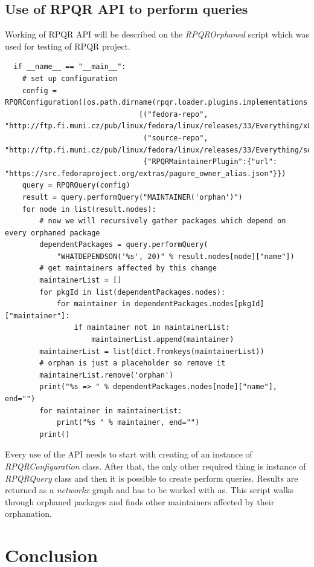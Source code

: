 \section{Use of RPQR API to perform queries}

Working of RPQR API will be described on the \textit{RPQROrphaned} script which was used for testing
of RPQR project.

\begin{lstlisting}
  if __name__ == "__main__":
    # set up configuration
    config = RPQRConfiguration([os.path.dirname(rpqr.loader.plugins.implementations.__file__)],
                               [("fedora-repo", "http://ftp.fi.muni.cz/pub/linux/fedora/linux/releases/33/Everything/x86_64/os/"),
                                ("source-repo", "http://ftp.fi.muni.cz/pub/linux/fedora/linux/releases/33/Everything/source/tree/")],
                                {"RPQRMaintainerPlugin":{"url": "https://src.fedoraproject.org/extras/pagure_owner_alias.json"}})
    query = RPQRQuery(config)
    result = query.performQuery("MAINTAINER('orphan')")
    for node in list(result.nodes):
        # now we will recursively gather packages which depend on every orphaned package
        dependentPackages = query.performQuery(
            "WHATDEPENDSON('%s', 20)" % result.nodes[node]["name"])
        # get maintainers affected by this change
        maintainerList = []
        for pkgId in list(dependentPackages.nodes):
            for maintainer in dependentPackages.nodes[pkgId]["maintainer"]:
                if maintainer not in maintainerList:
                    maintainerList.append(maintainer)
        maintainerList = list(dict.fromkeys(maintainerList))
        # orphan is just a placeholder so remove it
        maintainerList.remove('orphan')
        print("%s => " % dependentPackages.nodes[node]["name"], end="")
        for maintainer in maintainerList:
            print("%s " % maintainer, end="")
        print()
\end{lstlisting}

Every use of the API needs to start with creating of an instance of \textit{RPQRConfiguration} class.
After that, the only other required thing is instance of \textit{RPQRQuery} class and then it is
possible to create perform queries. Results are returned as a \textit{networkx} graph and has to be
worked with as. This script walks through orphaned packages and finds other maintainers affected by
their orphanation. 

\chapter{Conclusion}

\blindtext